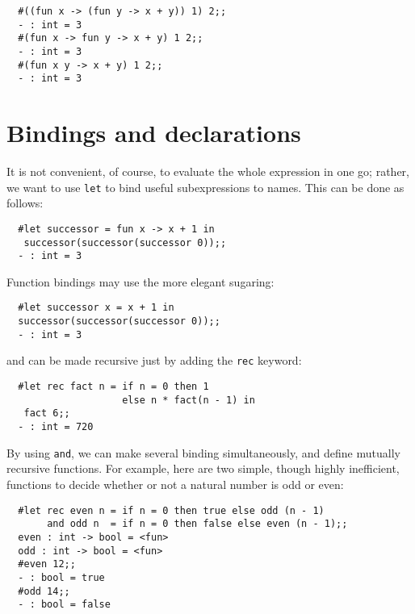 \begin{boxed}\begin{verbatim}
  #((fun x -> (fun y -> x + y)) 1) 2;;
  - : int = 3
  #(fun x -> fun y -> x + y) 1 2;;
  - : int = 3
  #(fun x y -> x + y) 1 2;;
  - : int = 3
\end{verbatim}\end{boxed}

\section{Bindings and declarations}

It is not convenient, of course, to evaluate the whole expression in one go;
rather, we want to use {\tt let} to bind useful subexpressions to names. This
can be done as follows:

\begin{boxed}\begin{verbatim}
  #let successor = fun x -> x + 1 in
   successor(successor(successor 0));;
  - : int = 3
\end{verbatim}\end{boxed}

\noindent Function bindings may use the more elegant sugaring:

\begin{boxed}\begin{verbatim}
  #let successor x = x + 1 in
  successor(successor(successor 0));;
  - : int = 3
\end{verbatim}\end{boxed}

\noindent and can be made recursive just by adding the {\tt rec} keyword:

\begin{boxed}\begin{verbatim}
  #let rec fact n = if n = 0 then 1
                    else n * fact(n - 1) in
   fact 6;;
  - : int = 720
\end{verbatim}\end{boxed}

By using {\tt and}, we can make several binding simultaneously, and define
mutually recursive functions. For example, here are two simple, though highly
inefficient, functions to decide whether or not a natural number is odd or
even:

\begin{boxed}\begin{verbatim}
  #let rec even n = if n = 0 then true else odd (n - 1)
       and odd n  = if n = 0 then false else even (n - 1);;
  even : int -> bool = <fun>
  odd : int -> bool = <fun>
  #even 12;;
  - : bool = true
  #odd 14;;
  - : bool = false
\end{verbatim}\end{boxed}

